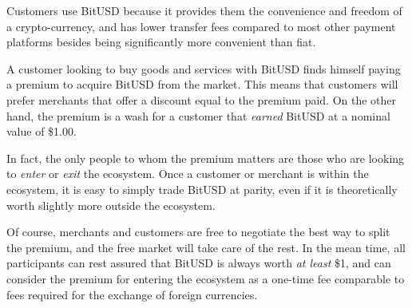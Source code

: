Customers use BitUSD because it provides them the convenience and freedom of a
crypto-currency, and has lower transfer fees compared to most other payment
platforms besides being significantly more convenient than fiat.

A customer looking to buy goods and services with BitUSD finds himself paying a
premium to acquire BitUSD from the market. This means that customers will
prefer merchants that offer a discount equal to the premium paid. On the other
hand, the premium is a wash for a customer that \emph{earned} BitUSD at a
nominal value of \$1.00.

In fact, the only people to whom the premium matters are those who are looking
to \emph{enter} or \emph{exit} the ecosystem. Once a customer or merchant is
within the ecosystem, it is easy to simply trade BitUSD at parity, even if it
is theoretically worth slightly more outside the ecosystem.

Of course, merchants and customers are free to negotiate the best way to split
the premium, and the free market will take care of the rest. In the mean time,
all participants can rest assured that BitUSD is always worth \emph{at least}
\$1, and can consider the premium for entering the ecosystem as a one-time fee
comparable to fees required for the exchange of foreign currencies.
